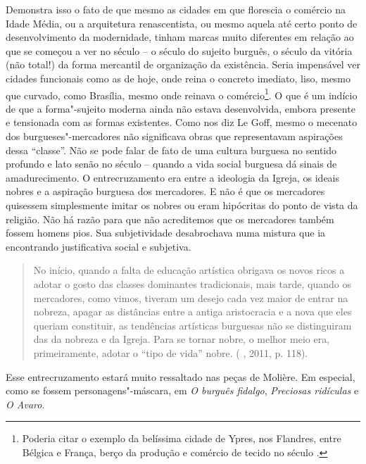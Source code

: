 Demonstra isso o fato de que mesmo as cidades em que florescia o
comércio na Idade Média, ou a arquitetura renascentista, ou mesmo aquela
até certo ponto de desenvolvimento da modernidade, tinham marcas muito
diferentes em relação ao que se começou a ver no século  -- o século
do sujeito burguês, o século da vitória (não total!) da forma mercantil
de organização da existência. Seria impensável ver cidades funcionais
como as de hoje, onde reina o concreto imediato, liso, mesmo que
curvado, como Brasília, mesmo onde reinava o comércio\footnote{Poderia
  citar o exemplo da belíssima cidade de Ypres, nos Flandres, entre
  Bélgica e França, berço da produção e comércio de tecido no século
  .}. O que é um indício de que a forma"-sujeito moderna ainda não
estava desenvolvida, embora presente e tensionada com as formas
existentes. Como nos diz Le Goff, mesmo o mecenato dos
burgueses"-mercadores não significava obras que representavam aspirações
dessa ``classe''. Não se pode falar de fato de uma cultura burguesa no
sentido profundo e lato senão no século  -- quando a vida
social burguesa dá sinais de amadurecimento. O entrecruzamento era entre
a ideologia da Igreja, os ideais nobres e a aspiração burguesa dos
mercadores. E não é que os mercadores quisessem simplesmente imitar os
nobres ou eram hipócritas do ponto de vista da religião. Não há razão
para que não acreditemos que os mercadores também fossem homens pios.
Sua subjetividade desabrochava numa mistura que ia encontrando
justificativa social e subjetiva.

\begin{quote}
No início, quando a falta de educação artística obrigava os novos ricos
a adotar o gosto das classes dominantes tradicionais, mais tarde, quando
os mercadores, como vimos, tiveram um desejo cada vez maior de entrar na
nobreza, apagar as distâncias entre a antiga aristocracia e a nova que
eles queriam constituir, as tendências artísticas burguesas não se
distinguiram das da nobreza e da Igreja. Para se tornar nobre, o melhor
meio era, primeiramente, adotar o ``tipo de vida'' nobre. ( ,
2011, p. 118).
\end{quote}

Esse entrecruzamento estará muito ressaltado nas peças de Molière. Em
especial, como se fossem personagens"-máscara, em \emph{O burguês
fidalgo}, \emph{Preciosas ridículas} e \emph{O Avaro}.


